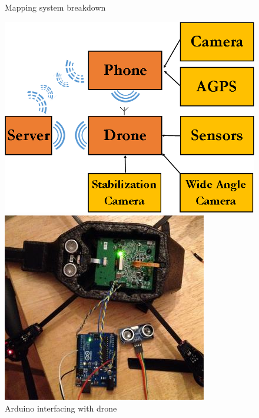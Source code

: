 \begin{figure}[h]
	\begin{minipage}{.5\textwidth}
		\caption{Mapping system breakdown}
		\centering
			\includegraphics[width=0.95\linewidth]{illustrations/system_chart}
	\end{minipage}
	\begin{minipage}{.5\textwidth}
		\caption{Arduino interfacing with drone}
		\label{fig:ArduinoDrone}
		\centering
			\includegraphics[width=0.95\linewidth]{illustrations/arduino_drone}
	\end{minipage}
\end{figure}

